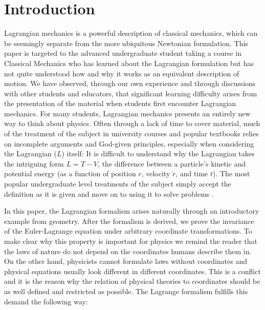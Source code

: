 \documentclass[prb,preprint]{revtex4-1}
\begin{document}
\maketitle



\section{Introduction}\label{introduction}

Lagrangian mechanics is a powerful description of classical mechanics, which can be seemingly separate from the more ubiquitous Newtonian formulation. This paper is targeted to the advanced undergraduate student taking a course in Classical Mechanics who has learned about the Lagrangian formulation but has not quite understood how and why it works as an equivalent description of motion. We have observed, through our own experience and through discussions with other students and educators, that significant learning difficulty arises from the presentation of the material when students first encounter Lagrangian mechanics. For many students, Lagrangian mechanics presents an entirely new way to think about physics. Often through a lack of time to cover material, much of the treatment of the subject in university courses and popular textbooks relies on incomplete arguments and God-given principles, especially when considering the Lagrangian ($L$) itself: It is difficult to understand why the Lagrangian takes the intriguing form $L=T-V$, the difference between a particle's kinetic and potential energy (as a function of position $r$, velocity $\dot{r}$, and time $t$). The most popular undergraduate level treatments of the subject simply accept the definition as it is given and move on to using it to solve problems \cite{taylor, marion, fowles, gregory}.

In this paper, the Lagrangian formalism arises naturally through an introductory example from geometry. After the formalism is derived, we prove the invariance of the Euler-Lagrange equation under arbitrary coordinate transformations. To make clear why this property is important for physics we remind the reader that the laws of nature do not depend on the coordinates humans describe them in. On the other hand, physicists cannot formulate laws without coordinates and physical equations usually look different in different coordinates. This is a conflict and it is the reason why the relation of physical theories to coordinates should be as well defined and restricted as possible. The Lagrange formalism fulfills this demand the following way: 
\end{document}
